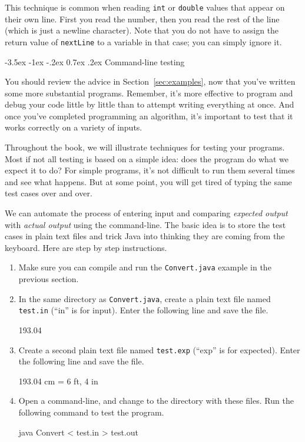 \documentclass[12pt]{book}
\makeatletter
\renewcommand{\section}{\@startsection {section}{1}{\z@}%
    {-3.5ex \@plus -1ex \@minus -.2ex}%
    {0.7ex \@plus.2ex}%
    {\normalfont\Large\bfseries}}
\theoremstyle{exercise}
\newcommand{\java}[1]{\lstinline{#1}} %
\makeatother
\begin{document}
This technique is common when reading \java{int} or \java{double} values that appear on their own line.
First you read the number, then you read the rest of the line (which is just a newline character).
Note that you do not have to assign the return value of \java{nextLine} to a variable in that case; you can simply ignore it.


\section{Command-line testing}

You should review the advice in Section~\ref{sec:examples}, now that you've written some more substantial programs.
Remember, it's more effective to program and debug your code little by little than to attempt writing everything at once.
And once you've completed programming an algorithm, it's important to test that it works correctly on a variety of inputs.

Throughout the book, we will illustrate techniques for testing your programs.
Most if not all testing is based on a simple idea: does the program do what we expect it to do?
For simple programs, it's not difficult to run them several times and see what happens.
But at some point, you will get tired of typing the same test cases over and over.

We can automate the process of entering input and comparing {\em expected output} with {\em actual output} using the command-line.
The basic idea is to store the test cases in plain text files and trick Java into thinking they are coming from the keyboard.
Here are step by step instructions.

\begin{enumerate}

\item Make sure you can compile and run the {\tt Convert.java} example in the previous section.

\item In the same directory as {\tt Convert.java}, create a plain text file named {\tt test.in} (``in'' is for input).
Enter the following line and save the file.

\begin{stdout}
193.04
\end{stdout}

\item Create a second plain text file named {\tt test.exp} (``exp'' is for expected).
Enter the following line and save the file.

\begin{stdout}
193.04 cm = 6 ft, 4 in
\end{stdout}

\item Open a command-line, and change to the directory with these files.
Run the following command to test the program.

\begin{stdout}
java Convert < test.in > test.out
\end{stdout}

\end{enumerate}
\end{document}
